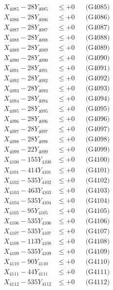 \documentclass[a4paper,10pt]{article}
\begin{document}
{\begin{align}
X_{4085} - 28Y_{4085} &\leq +0 && \text{(G4085)} \\
X_{4086} - 28Y_{4086} &\leq +0 && \text{(G4086)} \\
X_{4087} - 28Y_{4087} &\leq +0 && \text{(G4087)} \\
X_{4088} - 28Y_{4088} &\leq +0 && \text{(G4088)} \\
X_{4089} - 28Y_{4089} &\leq +0 && \text{(G4089)} \\
X_{4090} - 28Y_{4090} &\leq +0 && \text{(G4090)} \\
\allowbreak
X_{4091} - 28Y_{4091} &\leq +0 && \text{(G4091)} \\
X_{4092} - 28Y_{4092} &\leq +0 && \text{(G4092)} \\
X_{4093} - 28Y_{4093} &\leq +0 && \text{(G4093)} \\
X_{4094} - 28Y_{4094} &\leq +0 && \text{(G4094)} \\
X_{4095} - 28Y_{4095} &\leq +0 && \text{(G4095)} \\
X_{4096} - 28Y_{4096} &\leq +0 && \text{(G4096)} \\
X_{4097} - 28Y_{4097} &\leq +0 && \text{(G4097)} \\
X_{4098} - 28Y_{4098} &\leq +0 && \text{(G4098)} \\
X_{4099} - 22Y_{4099} &\leq +0 && \text{(G4099)} \\
X_{4100} - 155Y_{4100} &\leq +0 && \text{(G4100)} \\
\allowbreak
X_{4101} - 414Y_{4101} &\leq +0 && \text{(G4101)} \\
X_{4102} - 535Y_{4102} &\leq +0 && \text{(G4102)} \\
X_{4103} - 463Y_{4103} &\leq +0 && \text{(G4103)} \\
X_{4104} - 535Y_{4104} &\leq +0 && \text{(G4104)} \\
X_{4105} - 95Y_{4105} &\leq +0 && \text{(G4105)} \\
X_{4106} - 535Y_{4106} &\leq +0 && \text{(G4106)} \\
X_{4107} - 535Y_{4107} &\leq +0 && \text{(G4107)} \\
X_{4108} - 113Y_{4108} &\leq +0 && \text{(G4108)} \\
X_{4109} - 535Y_{4109} &\leq +0 && \text{(G4109)} \\
X_{4110} - 90Y_{4110} &\leq +0 && \text{(G4110)} \\
\allowbreak
X_{4111} - 44Y_{4111} &\leq +0 && \text{(G4111)} \\
X_{4112} - 535Y_{4112} &\leq +0 && \text{(G4112)} \\

\end{align}}
\end{document}
